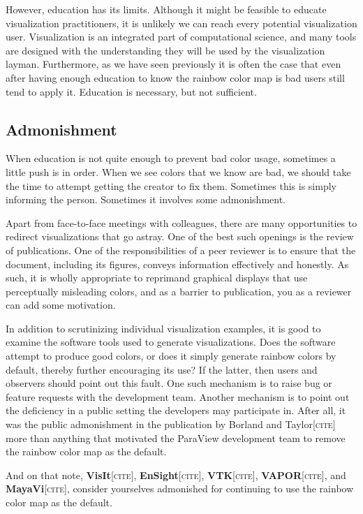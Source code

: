 \documentclass[letterpaper,twocolumn,fleqn]{article}
\newcommand{\fix}[1]{{\color{red}\textsc{[#1]}}}
\begin{document}
However, education has its limits. Although it might be feasible to educate
visualization practitioners, it is unlikely we can reach every potential
visualization user. Visualization is an integrated part of computational
science, and many tools are designed with the understanding they will be
used by the visualization layman. Furthermore, as we have seen previously
it is often the case that even after having enough education to know the
rainbow color map is bad users still tend to apply it. Education is
necessary, but not sufficient.

\subsection{Admonishment}

\noindent
When education is not quite enough to prevent bad color usage, sometimes a
little push is in order. When we see colors that we know are bad, we should
take the time to attempt getting the creator to fix them. Sometimes this is
simply informing the person. Sometimes it involves some admonishment.

Apart from face-to-face meetings with colleagues, there are many
opportunities to redirect visualizations that go astray. One of the best
such openings is the review of publications. One of the responsibilities of
a peer reviewer is to ensure that the document, including its figures,
conveys information effectively and honestly. As such, it is wholly
appropriate to reprimand graphical displays that use perceptually
misleading colors, and as a barrier to publication, you as a reviewer can
add some motivation.

In addition to scrutinizing individual visualization examples, it is good
to examine the software tools used to generate visualizations. Does the
software attempt to produce good colors, or does it simply generate rainbow
colors by default, thereby further encouraging its use? If the latter, then
users and observers should point out this fault. One such mechanism is to
raise bug or feature requests with the development team. Another mechanism
is to point out the deficiency in a public setting the developers may
participate in. After all, it was the public admonishment in the
publication by Borland and Taylor\fix{cite} more than anything that
motivated the ParaView development team to remove the rainbow color map as
the default.

And on that note, \textbf{VisIt}\fix{cite}, \textbf{EnSight}\fix{cite},
\textbf{VTK}\fix{cite}, \textbf{VAPOR}\fix{cite}, and
\textbf{MayaVi}\fix{cite}, consider yourselves admonished for continuing to
use the rainbow color map as the default.
\end{document}
